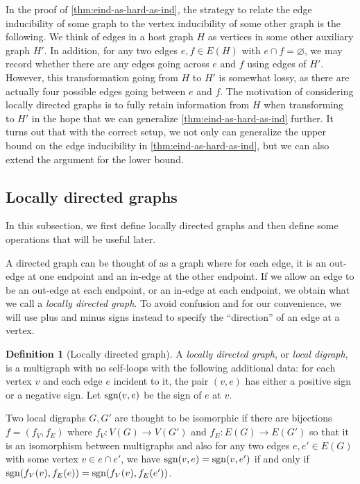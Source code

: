 \documentclass[reqno,11pt]{amsart}
\numberwithin{equation}{section}
\theoremstyle{definition}
\newtheorem{definition}[theorem]{Definition}
\theoremstyle{remark}
\begin{document}
In the proof of \cref{thm:eind-as-hard-as-ind}, the strategy to relate the edge inducibility of some graph to the vertex inducibility of some other graph is the following.
We think of edges in a host graph $H$ as vertices in some other auxiliary graph $H'$. 
In addition, for any two edges $e,f\in E(H)$ with $e\cap f=\varnothing$, we may record whether there are any edges going across $e$ and $f$ using edges of $H'$.
However, this transformation going from $H$ to $H'$ is somewhat lossy, as there are actually four possible edges going between $e$ and $f$.
The motivation of considering locally directed graphs is to fully retain information from $H$ when transforming to $H'$ in the hope that we can generalize \cref{thm:eind-as-hard-as-ind} further.
It turns out that with the correct setup, we not only can generalize the upper bound on the edge inducibility in \cref{thm:eind-as-hard-as-ind}, but we can also extend the argument for the lower bound.


\subsection{Locally directed graphs}
In this subsection, we first define locally directed graphs and then define some operations that will be useful later.

A directed graph can be thought of as a graph where for each edge, it is an out-edge at one endpoint and an in-edge at the other endpoint.
If we allow an edge to be an out-edge at each endpoint, or an in-edge at each endpoint, we obtain what we call a \emph{locally directed graph}.
To avoid confusion and for our convenience, we will use plus and minus signs instead to specify the ``direction'' of an edge at a vertex.
\begin{definition}[Locally directed graph]\label{def:local-digraph}
    A \emph{locally directed graph}, or \emph{local digraph}, is a multigraph with no self-loops with the following additional data: for each vertex $v$ and each edge $e$ incident to it, the pair $(v,e)$ has either a positive sign or a negative sign.
    Let $\textup{sgn}(v,e)$ be the sign of $e$ at $v$.
    
    Two local digraphs $G,G'$ are thought to be isomorphic if there are bijections $f = (f_V,f_E)$ where $f_V\colon V(G)\to V(G')$ and $f_E\colon E(G)\to E(G')$ so that it is an isomorphism between multigraphs and also for any two edges $e,e'\in E(G)$ with some vertex $v\in e\cap e'$, we have $\textup{sgn}(v,e)=\textup{sgn}(v,e')$ if and only if $\textup{sgn}(f_V(v),f_E(e))=\textup{sgn}(f_V(v),f_E(e'))$.
\end{definition}
\end{document}
